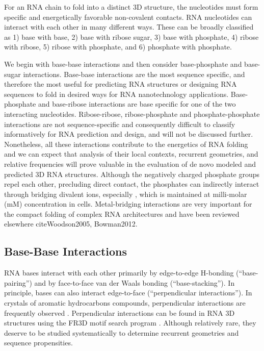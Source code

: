 For an RNA chain to fold into a distinct 3D structure, the nucleotides must form
specific and energetically favorable non-covalent contacts. RNA nucleotides can
interact with each other in many different ways. These can be broadly classified
as 1) base with base, 2) base with ribose sugar, 3) base with phosphate, 4)
ribose with ribose, 5) ribose with phosphate, and 6) phosphate with phosphate. 

We begin with base-base interactions and then consider base-phosphate and
base-sugar interactions. Base-base interactions are the most sequence specific,
and therefore the most useful for predicting RNA structures or designing RNA
sequences to fold in desired ways for RNA nanotechnology applications.
Base-phosphate and base-ribose interactions are base specific for one of the two
interacting nucleotides. Ribose-ribose, ribose-phosphate and phosphate-phosphate
interactions are not sequence-specific and consequently difficult to classify
informatively for RNA prediction and design, and will not be discussed further.
Nonetheless, all these interactions contribute to the energetics of RNA folding
and we can expect that analysis of their local contexts, recurrent geometries,
and relative frequencies will prove valuable in the evaluation of de novo
modeled and predicted 3D RNA structures. Although the negatively charged
phosphate groups repel each other, precluding direct contact, the phosphates can
indirectly interact through bridging divalent ions, especially , which is
maintained at milli-molar (mM) concentration in cells. Metal-bridging
interactions are very important for the compact folding of complex RNA
architectures and have been reviewed elsewhere cite{Woodson2005, Bowman2012}. 

\subsection{Base-Base Interactions}

RNA bases interact with each other primarily by edge-to-edge H-bonding
(``base-pairing'') and by face-to-face van der Waals bonding
(``base-stacking''). In principle, bases can also interact edge-to-face
(``perpendicular interactions''). In crystals of aromatic hydrocarbons
compounds, perpendicular interactions are frequently observed
\cite{Desiraju1989}. Perpendicular interactions can be found in RNA 3D
structures using the FR3D motif search program \cite{Petrov2011a}. Although
relatively rare, they deserve to be studied systematically to determine
recurrent geometries and sequence propensities. 

